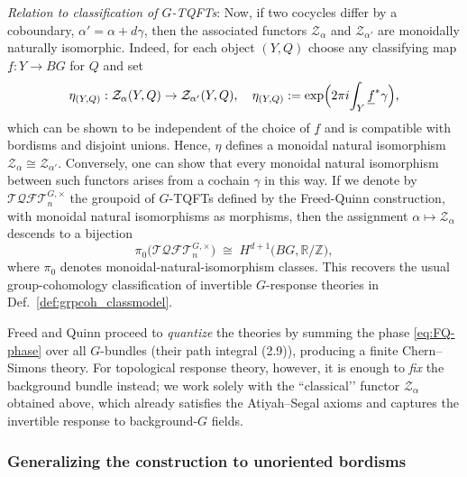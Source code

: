 \documentclass[aps,prx,reprint,superscriptaddress,twocolumn,amsmath,amssymb,amsfonts, nofootinbib]{revtex4-2}
\newcommand{\tqft}{\mathcal{TQFT}_{n}}
\theoremstyle{apsstyle}
\begin{document}
\noindent \textit{Relation to classification of $G$-TQFTs}: Now, if two cocycles differ by a coboundary, $\alpha'=\alpha+d\gamma$, then the associated functors $\mathcal Z_{\alpha}$ and $\mathcal Z_{\alpha'}$ are monoidally naturally isomorphic. Indeed, for each object $(Y,Q)$ choose any classifying map $\underline f:Y\to BG$ for $Q$ and set
\begin{equation*}
\eta_{(Y,Q)}:\mathcal Z_{\alpha}(Y,Q)\to \mathcal Z_{\alpha'}(Y,Q),\quad
\eta_{(Y,Q)}:=\exp\Bigl(2\pi i\!\int_Y \underline f^{*}\gamma\Bigr),
\end{equation*}
which can be shown to be independent of the choice of $\underline f$ and is compatible with bordisms and disjoint unions. Hence, $\eta$ defines a monoidal natural isomorphism $\mathcal Z_{\alpha}\cong \mathcal Z_{\alpha'}$. Conversely, one can show that every monoidal natural isomorphism between such functors arises from a cochain $\gamma$ in this way. 
If we denote by $\tqft^{G,\times}$ the groupoid of $G$-TQFTs defined by the Freed-Quinn construction, with monoidal natural isomorphisms as morphisms, then the assignment $\alpha\mapsto\mathcal Z_{\alpha}$ descends to a bijection
\begin{equation}
\label{eq:coh-classification}
   \pi_{0}\bigl(\tqft^{G,\times}\bigr)
   \;\cong\; H^{d+1}\bigl(BG,\mathbb R/\mathbb Z\bigr),
\end{equation}
where $\pi_0$ denotes monoidal-natural-isomorphism classes. This recovers the usual group-cohomology classification of invertible $G$-response theories in Def.~\ref{def:grpcoh_classmodel}.


\bigskip 

\noindent Freed and Quinn proceed to \emph{quantize} the theories by summing the phase \eqref{eq:FQ-phase} over all $G$-bundles (their path integral (2.9)), producing a finite Chern–Simons theory. For topological response theory, however, it is enough to \emph{fix} the background bundle instead; we work solely with the ``classical’’ functor $\mathcal{Z}_\alpha$ obtained above, which already satisfies the Atiyah–Segal axioms and captures the invertible response to background-$G$ fields.

\subsubsection{Generalizing the construction to unoriented bordisms}
\label{app:FQ_unoriented}
\end{document}
